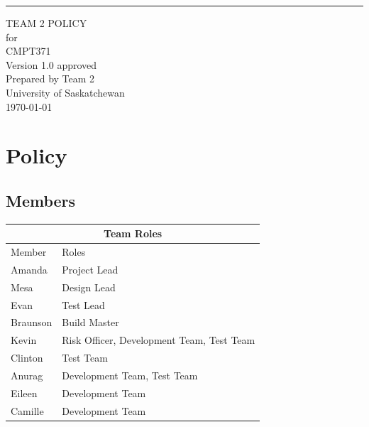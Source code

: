 \documentclass{scrreprt}
\date{}
\def\myversion{1.0 }
\begin{document}
\graphicspath{ {images/} }

\begin{flushright}
    \rule{16cm}{5pt}\vskip1cm
    \begin{bfseries}
        \Huge{TEAM 2 POLICY}\\
        \vspace{1.9cm}
        for\\
        \vspace{1.9cm}
        CMPT371\\
        \vspace{1.9cm}
        \LARGE{Version \myversion approved}\\
        \vspace{1.9cm}
        Prepared by Team 2\\
        \vspace{1.9cm}
        University of Saskatchewan\\
        \vspace{1.9cm}
        \today\\
    \end{bfseries}
\end{flushright}

\tableofcontents

\chapter{Policy}

\section{Members}

\begin{table}[h!]
\centering
\begin{tabular}{ |p{2cm}||p{8cm}|  }
    \hline
    \multicolumn{2}{|c|}{Team Roles} \\
    \hline
    Member & Roles\\
    \hline
    Amanda & Project Lead\\
    Mesa & Design Lead\\
    Evan & Test Lead\\
    Braunson & Build Master\\
    Kevin & Risk Officer, Development Team, Test Team\\
    Clinton & Test Team\\
    Anurag & Development Team, Test Team\\
    Eileen & Development Team\\
    Camille & Development Team\\
    \hline
\end{tabular}
\end{table}
\end{document}

